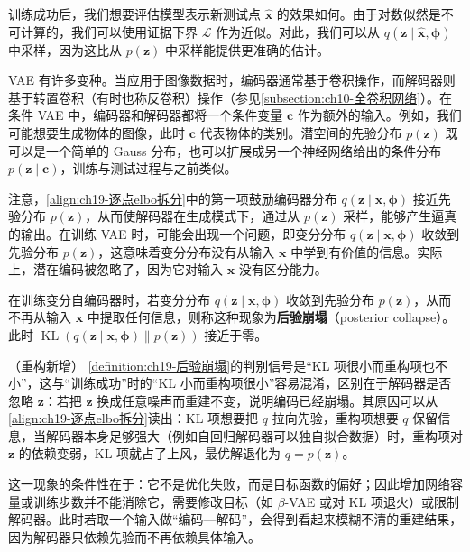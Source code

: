\documentclass[../../main.tex]{subfiles}
\begin{document}
训练成功后，我们想要评估模型表示新测试点 $\hat{\bm{x}}$ 的效果如何。由于对数似然是不可计算的，我们可以使用证据下界 $\mathcal{L}$ 作为近似。对此，我们可以从 $q(\bm{z}\mid\hat{\bm{x}},\bm{\phi})$ 中采样，因为这比从 $p(\bm{z})$ 中采样能提供更准确的估计。

VAE 有许多变种。当应用于图像数据时，编码器通常基于卷积操作，而解码器则基于转置卷积（有时也称反卷积）操作（参见\cref{subsection:ch10-全卷积网络}）。在条件 VAE 中，编码器和解码器都将一个条件变量 $\bm{c}$ 作为额外的输入。例如，我们可能想要生成物体的图像，此时 $\bm{c}$ 代表物体的类别。潜空间的先验分布 $p(\bm{z})$ 既可以是一个简单的 Gauss 分布，也可以扩展成另一个神经网络给出的条件分布 $p(\bm{z}\mid\bm{c})$，训练与测试过程与之前类似。

注意，\eqref{align:ch19-逐点elbo拆分}中的第一项鼓励编码器分布 $q(\bm{z}\mid\bm{x},\bm{\phi})$ 接近先验分布 $p(\bm{z})$，从而使解码器在生成模式下，通过从 $p(\bm{z})$ 采样，能够产生逼真的输出。在训练 VAE 时，可能会出现一个问题，即变分分布 $q(\bm{z}\mid\bm{x},\bm{\phi})$ 收敛到先验分布 $p(\bm{z})$，这意味着变分分布没有从输入 $\bm{x}$ 中学到有价值的信息。实际上，潜在编码被忽略了，因为它对输入 $\bm{x}$ 没有区分能力。

\begin{definition}[后验崩塌]\label{definition:ch19-后验崩塌}
在训练变分自编码器时，若变分分布 $q(\bm{z}\mid\bm{x},\bm{\phi})$ 收敛到先验分布 $p(\bm{z})$，从而不再从输入 $\bm{x}$ 中提取任何信息，则称这种现象为\textbf{后验崩塌}（posterior collapse）。此时 $\operatorname{KL}(q(\bm{z}\mid\bm{x},\bm{\phi})\|p(\bm{z}))$ 接近于零。
\end{definition}

\begin{remark}（重构新增）
\cref{definition:ch19-后验崩塌}的判别信号是“KL 项很小而重构项也不小”，这与“训练成功”时的“KL 小而重构项很小”容易混淆，区别在于解码器是否忽略 $\bm{z}$：若把 $\bm{z}$ 换成任意噪声而重建不变，说明编码已经崩塌。其原因可以从\eqref{align:ch19-逐点elbo拆分}读出：KL 项想要把 $q$ 拉向先验，重构项想要 $q$ 保留信息，当解码器本身足够强大（例如自回归解码器可以独自拟合数据）时，重构项对 $\bm{z}$ 的依赖变弱，KL 项就占了上风，最优解退化为 $q=p(\bm{z})$。

这一现象的条件性在于：它不是优化失败，而是目标函数的偏好；因此增加网络容量或训练步数并不能消除它，需要修改目标（如 $\beta$-VAE 或对 KL 项退火）或限制解码器。此时若取一个输入做“编码—解码”，会得到看起来模糊不清的重建结果，因为解码器只依赖先验而不再依赖具体输入。
\end{remark}
\end{document}
